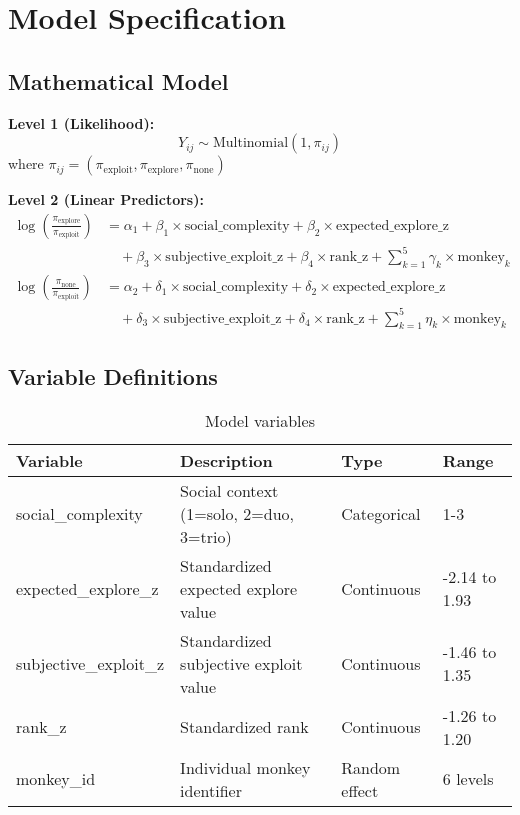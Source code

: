 \documentclass[11pt]{article}
\begin{document}
\section{Model Specification}

\subsection{Mathematical Model}

\textbf{Level 1 (Likelihood):}
\begin{equation}
Y_{ij} \sim \text{Multinomial}(1, \pi_{ij})
\end{equation}
where $\pi_{ij} = (\pi_{\text{exploit}}, \pi_{\text{explore}}, \pi_{\text{none}})$

\textbf{Level 2 (Linear Predictors):}
\begin{align}
\log\left(\frac{\pi_{\text{explore}}}{\pi_{\text{exploit}}}\right) &= \alpha_1 + \beta_1 \times \text{social\_complexity} + \beta_2 \times \text{expected\_explore\_z} \\
&\quad + \beta_3 \times \text{subjective\_exploit\_z} + \beta_4 \times \text{rank\_z} + \sum_{k=1}^{5} \gamma_k \times \text{monkey}_k \\
\log\left(\frac{\pi_{\text{none}}}{\pi_{\text{exploit}}}\right) &= \alpha_2 + \delta_1 \times \text{social\_complexity} + \delta_2 \times \text{expected\_explore\_z} \\
&\quad + \delta_3 \times \text{subjective\_exploit\_z} + \delta_4 \times \text{rank\_z} + \sum_{k=1}^{5} \eta_k \times \text{monkey}_k
\end{align}

\subsection{Variable Definitions}

\begin{table}[h]
\centering
\begin{tabular}{llll}
\toprule
\textbf{Variable} & \textbf{Description} & \textbf{Type} & \textbf{Range} \\
\midrule
social\_complexity & Social context (1=solo, 2=duo, 3=trio) & Categorical & 1-3 \\
expected\_explore\_z & Standardized expected explore value & Continuous & -2.14 to 1.93 \\
subjective\_exploit\_z & Standardized subjective exploit value & Continuous & -1.46 to 1.35 \\
rank\_z & Standardized rank & Continuous & -1.26 to 1.20 \\
monkey\_id & Individual monkey identifier & Random effect & 6 levels \\
\bottomrule
\end{tabular}
\caption{Model variables}
\end{table}
\end{document}
